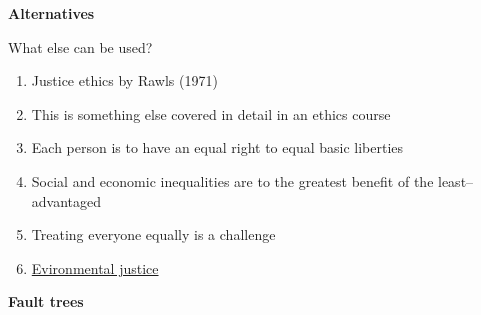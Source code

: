 \documentclass[aspectratio=1610,pdftex,dvipsnames,compress,xcolor={dvipsnames}]{beamer}
\begin{document}
\begin{frame}[plain]{}
    \centering\LARGE\textbf{Alternatives}
\end{frame}


\addtocounter{framenumber}{-1}
\begin{frame}{What else can be used?}
    \begin{enumerate}[series=outerlist,topsep=0pt,itemsep=21pt,leftmargin=*,label=(\arabic*)]
        \item[]Justice ethics by Rawls (1971)
        \item[]This is something else covered in detail in an ethics course
        \item[]Each person is to have an equal right to equal basic liberties
        \item[]Social and economic inequalities are to the greatest benefit of the least--advantaged
        \item[]Treating everyone equally is a challenge
        \item[]\href{https://www.epa.gov/environmentaljustice}{Evironmental justice}
    \end{enumerate}
\end{frame}


\begin{frame}[plain]{}
    \centering\LARGE\textbf{Fault trees}
\end{frame}
\end{document}
